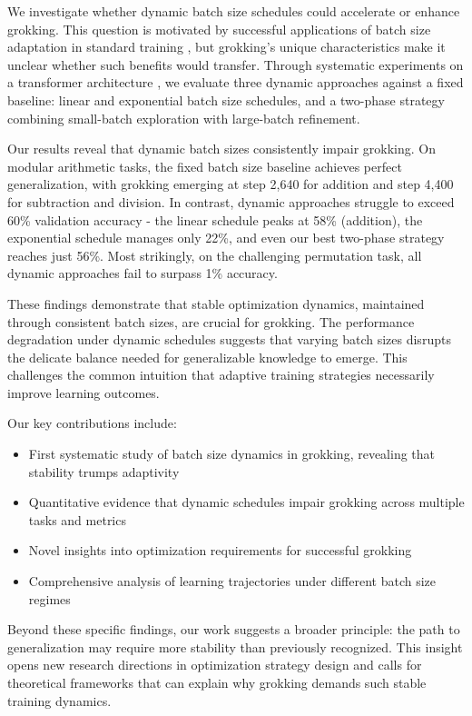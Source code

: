 \documentclass{article} %
\begin{document}
We investigate whether dynamic batch size schedules could accelerate or enhance grokking. This question is motivated by successful applications of batch size adaptation in standard training \citep{Smith2017DontDT}, but grokking's unique characteristics make it unclear whether such benefits would transfer. Through systematic experiments on a transformer architecture \citep{vaswani2017attention}, we evaluate three dynamic approaches against a fixed baseline: linear and exponential batch size schedules, and a two-phase strategy combining small-batch exploration with large-batch refinement.

Our results reveal that dynamic batch sizes consistently impair grokking. On modular arithmetic tasks, the fixed batch size baseline achieves perfect generalization, with grokking emerging at step 2,640 for addition and step 4,400 for subtraction and division. In contrast, dynamic approaches struggle to exceed 60\% validation accuracy - the linear schedule peaks at 58\% (addition), the exponential schedule manages only 22\%, and even our best two-phase strategy reaches just 56\%. Most strikingly, on the challenging permutation task, all dynamic approaches fail to surpass 1\% accuracy.

These findings demonstrate that stable optimization dynamics, maintained through consistent batch sizes, are crucial for grokking. The performance degradation under dynamic schedules suggests that varying batch sizes disrupts the delicate balance needed for generalizable knowledge to emerge. This challenges the common intuition that adaptive training strategies necessarily improve learning outcomes.

\noindent Our key contributions include:
\begin{itemize}
    \item First systematic study of batch size dynamics in grokking, revealing that stability trumps adaptivity
    \item Quantitative evidence that dynamic schedules impair grokking across multiple tasks and metrics
    \item Novel insights into optimization requirements for successful grokking
    \item Comprehensive analysis of learning trajectories under different batch size regimes
\end{itemize}

Beyond these specific findings, our work suggests a broader principle: the path to generalization may require more stability than previously recognized. This insight opens new research directions in optimization strategy design and calls for theoretical frameworks that can explain why grokking demands such stable training dynamics.
\end{document}
